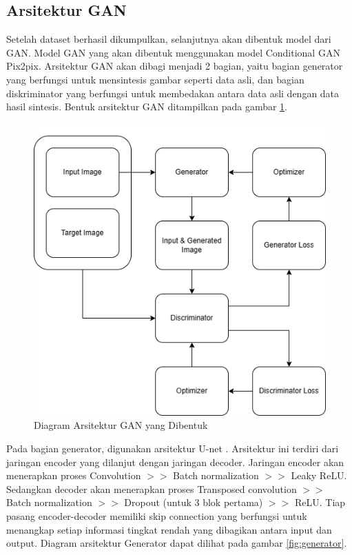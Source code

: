 \documentclass[conference]{IEEEtran}
\begin{document}
\subsection{Arsitektur GAN}
Setelah dataset berhasil dikumpulkan, selanjutnya akan dibentuk model dari GAN. 
Model GAN yang akan dibentuk menggunakan model Conditional GAN Pix2pix. 
Arsitektur GAN akan dibagi menjadi 2 bagian, yaitu bagian generator yang berfungsi untuk mensintesis gambar seperti data asli, dan bagian diskriminator yang berfungsi untuk membedakan antara data asli dengan data hasil sintesis. 
Bentuk arsitektur GAN ditampilkan pada gambar \ref{fig:arsitekturGAN}.

\begin{figure}[ht]
  \centering
  \includegraphics[scale=0.45]{gambar/Arsitektur GAN.png}
  \caption{Diagram Arsitektur GAN yang Dibentuk}
  \label{fig:arsitekturGAN}
\end{figure}

\newpage

Pada bagian generator, digunakan arsitektur U-net \cite{c1}. 
Arsitektur ini terdiri dari jaringan encoder yang dilanjut dengan jaringan decoder. 
Jaringan encoder akan menerapkan proses Convolution $>>$ Batch normalization $>>$ Leaky ReLU. 
Sedangkan decoder akan menerapkan proses Transposed convolution $>>$ Batch normalization $>>$ Dropout (untuk 3 blok pertama) $>>$ ReLU. 
Tiap pasang encoder-decoder memiliki skip connection yang berfungsi untuk menangkap setiap informasi tingkat rendah yang dibagikan antara input dan output. 
Diagram arsitektur Generator dapat dilihat pada gambar \ref{fig:generator}.
\end{document}
